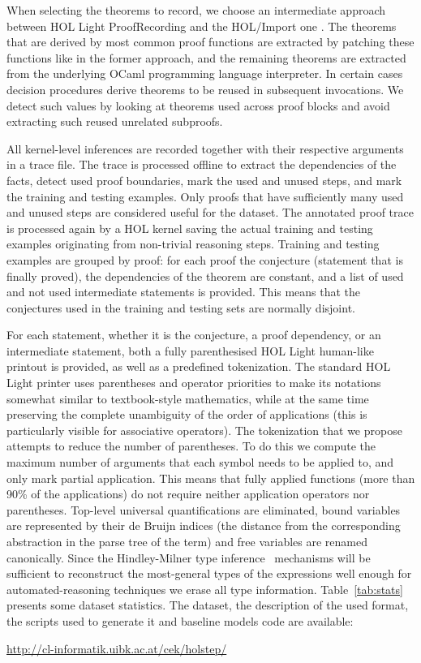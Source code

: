 \documentclass[]{article}
\begin{document}
When selecting the theorems to record, we choose an intermediate approach
between HOL Light ProofRecording \citep{importold} and the HOL/Import one
\citep{importnew}. The theorems that are derived by most common proof
functions are extracted by patching these functions like in the former approach,
and the remaining theorems are extracted from the underlying OCaml programming
language interpreter. In certain cases decision procedures derive theorems
to be reused in subsequent invocations. We detect such values by looking
at theorems used across proof blocks and avoid extracting such reused unrelated
subproofs.

All kernel-level inferences are recorded together with their respective arguments
in a trace file. The trace is processed offline to extract the dependencies of the facts,
detect used proof boundaries,  mark the used and unused steps, and mark the training
and testing examples. Only proofs that have sufficiently many used and unused
steps are considered useful for the dataset. The annotated proof trace
is processed again by a HOL kernel saving the actual training and testing examples
originating from non-trivial reasoning steps. Training and testing examples are grouped by
proof: for each proof the conjecture (statement that is finally proved), the
dependencies of the theorem are constant, and a list of used and not used
intermediate statements is provided. This means that the conjectures used in the
training and testing sets are normally disjoint.

For each statement, whether it is the conjecture, a proof dependency, or an
intermediate statement, both a fully parenthesised HOL Light human-like printout
is provided, as well as a predefined tokenization. The standard HOL Light printer
uses parentheses and operator priorities to make its notations somewhat similar
to textbook-style mathematics, while at the same time preserving the complete
unambiguity of the order of applications (this is particularly visible for
associative operators). The tokenization that we propose attempts to reduce
the number of parentheses. To do this we compute the maximum number of arguments
that each symbol needs to be applied to, and only mark partial application. This
means that fully applied functions (more than 90\% of the applications) do not
require neither application operators nor parentheses. Top-level universal quantifications
are eliminated, bound variables are represented by their de Bruijn indices (the distance from the corresponding abstraction in the parse tree of the term) and free
variables are renamed canonically. Since the Hindley-Milner type inference~\cite{hindley1969principal} mechanisms
will be sufficient to reconstruct the most-general types of the expressions well enough for
automated-reasoning techniques \citet{alignedcorpora} we erase all type information.
Table~\ref{tab:stats} presents some dataset statistics.
The dataset, the description of the used format, the scripts used to generate it and baseline models code are available: \\[1mm]
\centerline{\url{http://cl-informatik.uibk.ac.at/cek/holstep/}}
\end{document}
